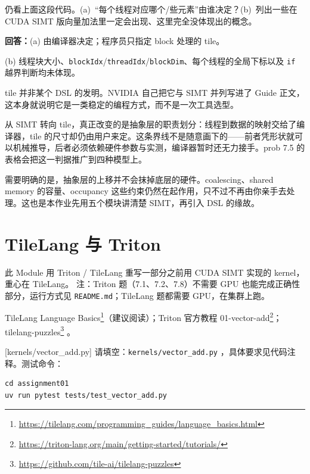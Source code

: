 \documentclass[11pt,a4paper,fontset=windows]{ctexart}
\begin{document}
仍看上面这段代码。(a)~“每个线程对应哪个/些元素”由谁决定？(b)~列出一些在 CUDA SIMT 版向量加法里一定会出现、这里完全没体现出的概念。

\par\textbf{回答：}(a) 由编译器决定；程序员只指定 block 处理的 tile。

(b) 线程块大小、\texttt{blockIdx}/\texttt{threadIdx}/\texttt{blockDim}、每个线程的全局下标以及 \texttt{if} 越界判断均未体现。

\begin{lookback}
tile 并非某个 DSL 的发明。NVIDIA 自己把它与 SIMT 并列写进了 Guide 正文，这本身就说明它是一类稳定的编程方式，而不是一次工具选型。

从 SIMT 转向 tile，真正改变的是抽象层的职责划分：线程到数据的映射交给了编译器，tile 的尺寸却仍由用户来定。这条界线不是随意画下的——前者凭形状就可以机械推导，后者必须依赖硬件参数与实测，编译器暂时还无力接手。prob 7.5 的表格会把这一判据推广到四种模型上。

需要明确的是，抽象层的上移并不会抹掉底层的硬件。coalescing、shared memory 的容量、occupancy 这些约束仍然在起作用，只不过不再由你亲手去处理。这也是本作业先用五个模块讲清楚 SIMT，再引入 DSL 的缘故。
\end{lookback}

\section{TileLang 与 Triton}

此 Module 用 Triton / TileLang 重写一部分之前用 CUDA SIMT 实现的 kernel，重心在 TileLang。
注：Triton 题（7.1、7.2、7.8）不需要 GPU 也能完成正确性部分，运行方式见 \texttt{README.md}；TileLang 题都需要 GPU，在集群上跑。

\begin{reading}
TileLang Language Basics\footnote{\url{https://tilelang.com/programming_guides/language_basics.html}}（建议阅读）；Triton 官方教程 01-vector-add\footnote{\url{https://triton-lang.org/main/getting-started/tutorials/}}；tilelang-puzzles\footnote{\url{https://github.com/tile-ai/tilelang-puzzles}} 。
\end{reading}

[kernels/vector\_add.py]
请填空：\texttt{kernels/vector\_add.py} ，具体要求见代码注释。测试命令：

\begin{lstlisting}
cd assignment01
uv run pytest tests/test_vector_add.py
\end{lstlisting}
\end{document}
